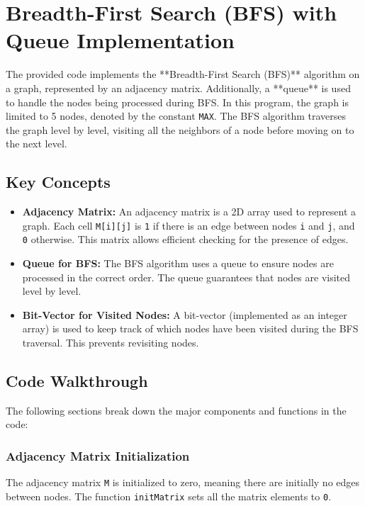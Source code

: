 \documentclass{book}
\begin{document}
\section{Breadth-First Search (BFS) with Queue Implementation}

The provided code implements the **Breadth-First Search (BFS)** algorithm on a graph, represented by an adjacency matrix. Additionally, a **queue** is used to handle the nodes being processed during BFS. In this program, the graph is limited to 5 nodes, denoted by the constant \texttt{MAX}. The BFS algorithm traverses the graph level by level, visiting all the neighbors of a node before moving on to the next level.

\subsection{Key Concepts}

\begin{itemize}
    \item \textbf{Adjacency Matrix:} An adjacency matrix is a 2D array used to represent a graph. Each cell \texttt{M[i][j]} is \texttt{1} if there is an edge between nodes \texttt{i} and \texttt{j}, and \texttt{0} otherwise. This matrix allows efficient checking for the presence of edges.
    \item \textbf{Queue for BFS:} The BFS algorithm uses a queue to ensure nodes are processed in the correct order. The queue guarantees that nodes are visited level by level.
    \item \textbf{Bit-Vector for Visited Nodes:} A bit-vector (implemented as an integer array) is used to keep track of which nodes have been visited during the BFS traversal. This prevents revisiting nodes.
\end{itemize}

\subsection{Code Walkthrough}

The following sections break down the major components and functions in the code:

\subsubsection{Adjacency Matrix Initialization}

The adjacency matrix \texttt{M} is initialized to zero, meaning there are initially no edges between nodes. The function \texttt{initMatrix} sets all the matrix elements to \texttt{0}.
\end{document}
